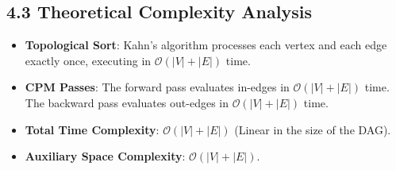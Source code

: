 \documentclass[12pt]{article}
\begin{document}
\subsection*{4.3 Theoretical Complexity Analysis}
\begin{itemize}
    \item \textbf{Topological Sort}: Kahn's algorithm processes each vertex and each edge exactly once, executing in $\mathcal{O}(|V| + |E|)$ time.
    \item \textbf{CPM Passes}: The forward pass evaluates in-edges in $\mathcal{O}(|V| + |E|)$ time. The backward pass evaluates out-edges in $\mathcal{O}(|V| + |E|)$ time.
    \item \textbf{Total Time Complexity}: $\mathcal{O}(|V| + |E|)$ (Linear in the size of the DAG).
    \item \textbf{Auxiliary Space Complexity}: $\mathcal{O}(|V| + |E|)$.
\end{itemize}
\end{document}
